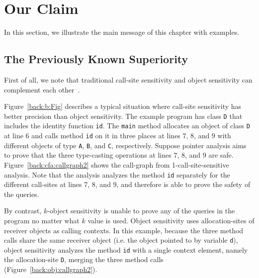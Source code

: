 \section{Our Claim}\label{sec:insight}
In this section, we illustrate the main message of this chapter with examples. 



\subsection{The Previously Known Superiority}\label{sec:call-vs-obj}

First of all, we note that traditional call-site sensitivity and
object sensitivity can complement each other~\cite{liang2005evaluating}.



Figure~\ref{back:b:Fig} describes a typical situation where
call-site sensitivity has better precision than object sensitivity.
The example program has class {\tt D} that includes the identity
function {\tt id}. The {\tt main} method allocates an object of class
{\tt D} at line 6
and calls method {\tt id} on it in three places
at lines 7, 8, and 9 with different objects of type {\tt A}, {\tt B},
and {\tt C}, respectively.  Suppose pointer analysis aims to prove
that the three type-casting operations at lines 7, 8, and 9 are safe.
Figure~\ref{back:cfa:callgraph2} shows the call-graph from
1-call-site-sensitive analysis. Note that the analysis analyzes the
method {\tt id} separately for the different call-sites at lines 
7, 8, and 9, and therefore is able to prove the safety of the queries. 


By contrast, $k$-object sensitivity is unable to prove any of the
queries in the program no matter what $k$ value is
used. Object sensitivity uses allocation-sites of receiver objects as
calling contexts. In this example, because the three method calls
share the same receiver object (i.e. the object pointed to by variable
{\tt d}), object sensitivity analyzes the method {\tt id}
with a single context element, namely the allocation-site {\tt D},
merging the three method calls (Figure~\ref{back:obj:callgraph2}).



